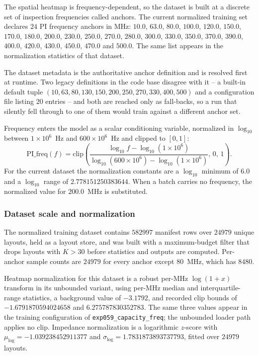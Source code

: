 The spatial heatmap is frequency-dependent, so the dataset is built at a discrete
set of inspection frequencies called anchors. The current normalized training set
declares $24$ PI frequency anchors in MHz: $10.0$, $63.0$, $80.0$, $100.0$,
$120.0$, $150.0$, $170.0$, $180.0$, $200.0$, $230.0$, $250.0$, $270.0$, $280.0$,
$300.0$, $330.0$, $350.0$, $370.0$, $390.0$, $400.0$, $420.0$, $430.0$, $450.0$,
$470.0$ and $500.0$. The same list appears in the normalization statistics of
that dataset.

The dataset metadata is the authoritative anchor definition and is resolved
first at runtime. Two legacy definitions in the code base disagree with it -- a
built-in default tuple $(10, 63, 80, 130, 150, 200, 250, 270, 330, 400, 500)$
and a configuration file listing $20$ entries -- and both are reached only as
fall-backs, so a run that silently fell through to one of them would train
against a different anchor set.

Frequency enters the model as a scalar conditioning variable, normalized in
$\log_{10}$ between $1 \times 10^{6}$~Hz and $600 \times 10^{6}$~Hz and clipped
to $[0,1]$:
\begin{equation}
\mathrm{PI\_freq}(f) =
\mathrm{clip}\!\left(
\frac{\log_{10} f - \log_{10}(1{\times}10^{6})}
     {\log_{10}(600{\times}10^{6}) - \log_{10}(1{\times}10^{6})},\, 0,\, 1
\right).
\label{eq:pifreq_norm}
\end{equation}
For the current dataset the normalization constants are a $\log_{10}$ minimum of
$6.0$ and a $\log_{10}$ range of $2.778151250383644$. When a batch carries no
frequency, the normalized value for $200.0$~MHz is substituted.

\subsubsection*{Dataset scale and normalization}

The normalized training dataset contains $582997$ manifest rows over $24979$
unique layouts, held as a layout store, and was built with a maximum-budget
filter that drops layouts with $K > 30$ before statistics and outputs are
computed. Per-anchor sample counts are $24979$ for every anchor except
$80$~MHz, which has $8480$.

Heatmap normalization for this dataset is a robust per-MHz $\log(1+x)$ transform
in its unbounded variant, using per-MHz median and interquartile-range
statistics, a background value of $-3.1792$, and recorded clip bounds of
$-1.6791870594024658$ and $6.275787830352783$. The same three values appear in
the training configuration of \texttt{exp059\_capacity\_freq}; the unbounded
loader path applies no clip. Impedance normalization is a logarithmic
$z$-score with $\mu_{\log} = -1.039238452911377$ and
$\sigma_{\log} = 1.7831873893737793$, fitted over $24979$ layouts.

